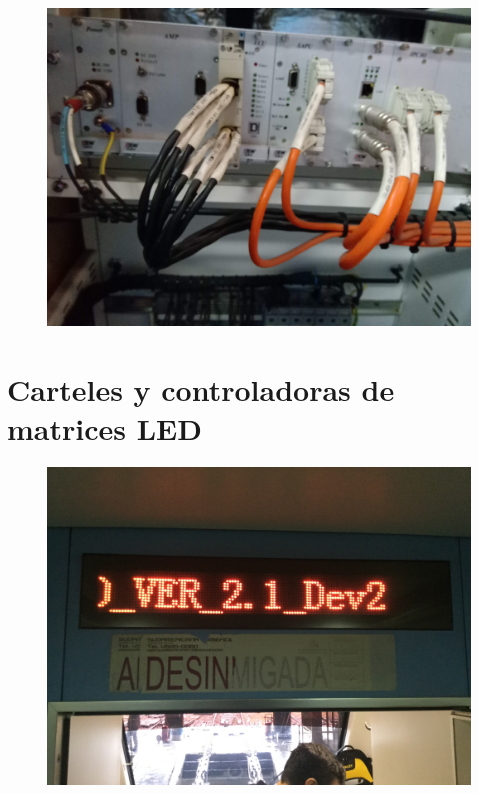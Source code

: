 \begin{figure}[ht]
	\centering
	\includegraphics[width=1\textwidth ]{./Figures/rackPIDS2.jpg}
	\caption{}
	\label{fig:rackPIDS2}
\end{figure}


\pagebreak
\section{Carteles y controladoras de matrices LED}

\begin{figure}[ht]
	\centering
	\includegraphics[width=1\textwidth]{./Figures/cartelIniciando.JPG}
	\caption{}
	\label{fig:cartelIniciando}
\end{figure}

